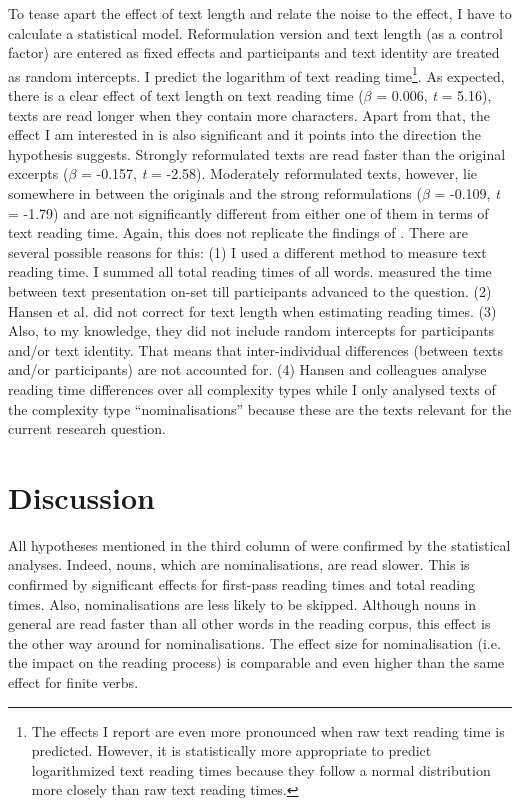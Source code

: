 \documentclass[output=paper]{langsci/langscibook}
\begin{document}
To tease apart the effect of text length and relate the noise to the effect, I have to calculate a statistical model. Reformulation version and text length (as a control factor) are entered as fixed effects and participants and text identity are treated as random intercepts. I predict the logarithm of text reading time\footnote{The effects I report are even more pronounced when raw text reading time is predicted. However, it is statistically more appropriate to predict logarithmized text reading times because they follow a normal distribution more closely than raw text reading times.}. As expected, there is a clear effect of text length on text reading time (\textit{$\beta $} = 0.006, \textit{t} = 5.16), texts are read longer when they contain more characters. Apart from that, the effect I am interested in is also significant and it points into the direction the hypothesis suggests. Strongly reformulated texts are read faster than the original excerpts (\textit{$\beta $} = -0.157, \textit{t} = -2.58). Moderately reformulated texts, however, lie somewhere in between the originals and the strong reformulations (\textit{$\beta $} = -0.109, \textit{t} = -1.79) and are not significantly different from either one of them in terms of text reading time. Again, this does not replicate the findings of \citet{Hansen2006}. There are several possible reasons for this: (1) I used a different method to measure text reading time. I summed all total reading times of all words. \citet{Hansen2006} measured the time between text presentation on-set till participants advanced to the question. (2) Hansen et al. did not correct for text length when estimating reading times. (3) Also, to my knowledge, they did not include random intercepts for participants and/or text identity. That means that inter-individual differences (between texts and/or participants) are not accounted for.\label{bkm:Ref283726149} (4) Hansen and colleagues analyse reading time differences over all complexity types while I only analysed texts of the complexity type ``nominalisations'' because these are the texts relevant for the current research question. 

\section{Discussion}

All hypotheses mentioned in the third column of  were confirmed by the statistical analyses. Indeed, nouns, which are nominalisations, are read slower. This is confirmed by significant effects for first-pass reading times and total reading times. Also, nominalisations are less likely to be skipped. Although nouns in general are read faster than all other words in the reading corpus, this effect is the other way around for nominalisations. The effect size for nominalisation (i.e. the impact on the reading process) is comparable and even higher than the same effect for finite verbs.
\end{document}
